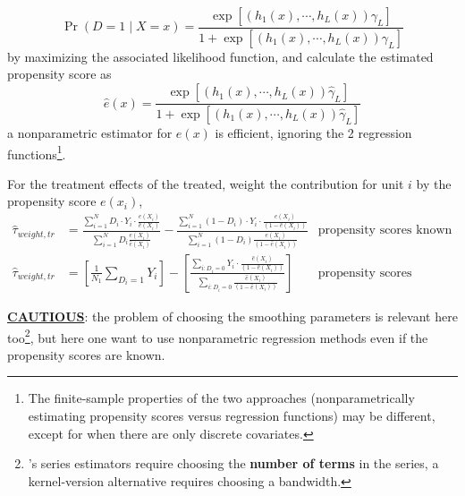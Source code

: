 \documentclass[twoside]{article}
\begin{document}
\begin{itemize}
\begin{equation*}
        \Pr \left(D=1\mid X=x\right) = \frac{\exp \left[ \left(h_1(x),\cdots,h_L(x)\right) \gamma_L \right]}{1+\exp \left[ \left(h_1(x),\cdots,h_L(x)\right) \gamma_L \right]}
    \end{equation*}
    by maximizing the associated likelihood function, and calculate the estimated propensity score as 
    \begin{equation*}
        \hat{e}(x) = \frac{\exp \left[ \left(h_1(x),\cdots,h_L(x)\right) \hat{\gamma}_L \right]}{1+\exp \left[ \left(h_1(x),\cdots,h_L(x)\right) \hat{\gamma}_L \right]}
    \end{equation*}
    a nonparametric estimator for $e(x)$ is efficient, ignoring the 2 regression functions\footnote{The finite-sample properties of the two approaches (nonparametrically estimating propensity scores versus regression functions) may be different, except for when there are only discrete covariates.}.
    
    For the treatment effects of the treated, weight the contribution for unit $i$ by the propensity score $e(x_i)$,
    \begin{align*}
        \hat{\tau}_{weight,tr} &= \frac{\sum^N_{i=1} D_i\cdot Y_i\cdot \frac{e(X_i)}{\hat{e}(X_i)} }{ \sum^N_{i=1} D_i \frac{e(X_i)}{\hat{e}(X_i)} } - \frac{\sum^N_{i=1} (1-D_i)\cdot Y_i\cdot \frac{e(X_i)}{\left(1-\hat{e}(X_i)\right)} }{ \sum^N_{i=1} (1-D_i) \frac{e(X_i)}{ \left(1-\hat{e}(X_i)\right) } } & \text{propensity scores known} \\
        \hat{\tau}_{weight,tr} &= \left[\frac{1}{N_1} \sum_{D_i=1}Y_i \right] - \left[ \frac{\sum_{i:D_i=0} Y_i \cdot \frac{\hat{e}(X_i)}{\left(1-\hat{e}(X_i)\right)} }{ \sum_{i:D_i=0} \frac{\hat{e}(X_i)}{\left(1-\hat{e}(X_i)\right)} }  \right] & \text{propensity scores unknown}
    \end{align*}

    \underline{\textbf{CAUTIOUS}}: the problem of choosing the smoothing parameters is relevant here too\footnote{\citet*{hirano2003efficient}'s series estimators require choosing the \textbf{number of terms} in the series, a kernel-version alternative requires choosing a bandwidth.}, but here one want to use nonparametric regression methods even if the propensity scores are known.
    

\end{itemize}
\end{document}
